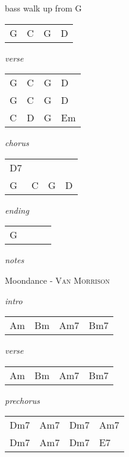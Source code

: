 \documentclass[12pt]{article}
\begin{document}
bass walk up from G

\begin{tabular}{|P{1.25in}|P{1.25in}|P{1.25in}|P{1.25in}|}
  G &  C  &  G  &  D \\
\end{tabular}

\textit{verse}

\begin{tabular}{|P{1.25in}|P{1.25in}|P{1.25in}|P{1.25in}|}
  G &  C  &  G  &  D \\
  G &  C  &  G  &  D \\
  C &  D  &  G  &  Em \\
\end{tabular}

\textit{chorus}

\begin{tabular}{|P{1.25in}|P{1.25in}|P{1.25in}|P{1.25in}|}
  D7 &     &     &   \\
  G  &  C  &  G  &  D \\
\end{tabular}

\textit{ending}

\begin{tabular}{|P{1.25in}|P{1.25in}|P{1.25in}|P{1.25in}|}
  G  &   &   &   \\
\end{tabular}

\textit{notes}



\newpage

{\Huge Moondance} {\huge - \textsc{Van Morrison}}

\huge
\textit{intro}

\begin{tabular}{|P{1.25in}|P{1.25in}|P{1.25in}|P{1.25in}|}
  Am  & Bm  & Am7  & Bm7  \\
\end{tabular}

\textit{verse}

\begin{tabular}{|P{1.25in}|P{1.25in}|P{1.25in}|P{1.25in}|}
  Am  & Bm  & Am7  & Bm7  \\
\end{tabular}

\textit{prechorus}

\begin{tabular}{|P{1.25in}|P{1.25in}|P{1.25in}|P{1.25in}|}
  Dm7  & Am7  &  Dm7 &  Am7 \\
  Dm7  & Am7  &  Dm7 &  E7 \\
\end{tabular}
\end{document}
